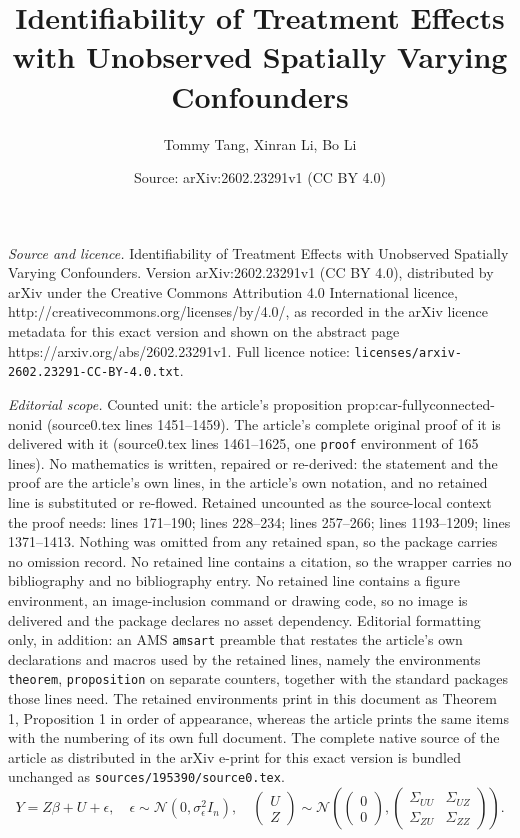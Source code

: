 \documentclass[10pt,a4paper]{amsart}
\title{Identifiability of Treatment Effects with Unobserved Spatially Varying Confounders}
\author{Tommy Tang, Xinran Li, Bo Li}
\date{Source: arXiv:2602.23291v1 (CC BY 4.0)}
\begin{document}
\maketitle

\noindent\emph{Source and licence.} Identifiability of Treatment Effects with Unobserved Spatially Varying Confounders. Version arXiv:2602.23291v1 (CC BY 4.0), distributed by arXiv under the Creative Commons Attribution 4.0 International licence, http://creativecommons.org/licenses/by/4.0/, as recorded in the arXiv licence metadata for this exact version and shown on the abstract page https://arxiv.org/abs/2602.23291v1. Full licence notice: \texttt{licenses/arxiv-2602.23291-CC-BY-4.0.txt}.\par\smallskip

\noindent\textit{Editorial scope.} Counted unit: the article's proposition prop:car-fullyconnected-nonid (source0.tex lines 1451--1459). The article's complete original proof of it is delivered with it (source0.tex lines 1461--1625, one \texttt{proof} environment of 165 lines). No mathematics is written, repaired or re-derived: the statement and the proof are the article's own lines, in the article's own notation, and no retained line is substituted or re-flowed.  Retained uncounted as the source-local context the proof needs: lines 171--190; lines 228--234; lines 257--266; lines 1193--1209; lines 1371--1413.  Nothing was omitted from any retained span, so the package carries no omission record.  No retained line contains a citation, so the wrapper carries no bibliography and no bibliography entry.  No retained line contains a figure environment, an image-inclusion command or drawing code, so no image is delivered and the package declares no asset dependency.  Editorial formatting only, in addition: an AMS \texttt{amsart} preamble that restates the article's own declarations and macros used by the retained lines, namely the environments \texttt{theorem}, \texttt{proposition} on separate counters, together with the standard packages those lines need.  The retained environments print in this document as Theorem 1, Proposition 1 in order of appearance, whereas the article prints the same items with the numbering of its own full document.  The complete native source of the article as distributed in the arXiv e-print for this exact version is bundled unchanged as \texttt{sources/195390/source0.tex}.
\begin{equation}\label{eq:simp-model}
    Y = Z \beta + U + \epsilon, 
    \quad \epsilon \sim \mathcal{N}(0, \sigma_{\epsilon}^2 I_n), 
    \quad 
    \begin{pmatrix}
        U\\
        Z
    \end{pmatrix} 
    \sim \mathcal{N}
    \left(  
    \begin{pmatrix}
        0\\
        0
    \end{pmatrix}, 
    \begin{pmatrix}
        \Sigma_{UU} & \Sigma_{UZ}\\
        \Sigma_{ZU} & \Sigma_{ZZ}
    \end{pmatrix}
    \right). 
\end{equation}
\end{document}
